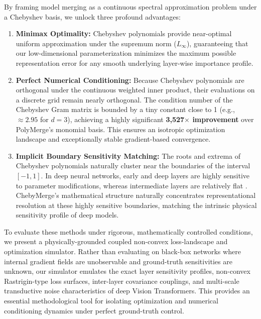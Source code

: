 By framing model merging as a continuous spectral approximation problem under a Chebyshev basis, we unlock three profound advantages:
\begin{enumerate}
    \item \textbf{Minimax Optimality:} Chebyshev polynomials provide near-optimal uniform approximation under the supremum norm ($L_\infty$), guaranteeing that our low-dimensional parameterization minimizes the maximum possible representation error for any smooth underlying layer-wise importance profile.
    \item \textbf{Perfect Numerical Conditioning:} Because Chebyshev polynomials are orthogonal under the continuous weighted inner product, their evaluations on a discrete grid remain nearly orthogonal. The condition number of the Chebyshev Gram matrix is bounded by a tiny constant close to 1 (e.g., $\approx 2.95$ for $d=3$), achieving a highly significant \textbf{3,527$\times$ improvement} over PolyMerge's monomial basis. This ensures an isotropic optimization landscape and exceptionally stable gradient-based convergence.
    \item \textbf{Implicit Boundary Sensitivity Matching:} The roots and extrema of Chebyshev polynomials naturally cluster near the boundaries of the interval $[-1, 1]$. In deep neural networks, early and deep layers are highly sensitive to parameter modifications, whereas intermediate layers are relatively flat \cite{zhang2019all}. ChebyMerge's mathematical structure naturally concentrates representational resolution at these highly sensitive boundaries, matching the intrinsic physical sensitivity profile of deep models.
\end{enumerate}

To evaluate these methods under rigorous, mathematically controlled conditions, we present a physically-grounded coupled non-convex loss-landscape and optimization simulator. Rather than evaluating on black-box networks where internal gradient fields are unobservable and ground-truth sensitivities are unknown, our simulator emulates the exact layer sensitivity profiles, non-convex Rastrigin-type loss surfaces, inter-layer covariance couplings, and multi-scale transductive noise characteristics of deep Vision Transformers. This provides an essential methodological tool for isolating optimization and numerical conditioning dynamics under perfect ground-truth control.

